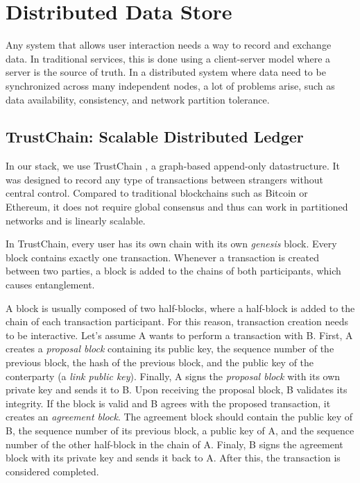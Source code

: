 \section{Distributed Data Store}

Any system that allows user interaction needs a way to record and exchange data. In traditional services, this is done using a client-server model where a server is the source of truth. In a distributed system where data need to be synchronized across many independent nodes, a lot of problems arise, such as data availability, consistency, and network partition tolerance.

\subsection{TrustChain: Scalable Distributed Ledger}

In our stack, we use TrustChain \cite{trustchain}, a graph-based append-only datastructure. It was designed to record any type of transactions between strangers without central control. Compared to traditional blockchains such as Bitcoin or Ethereum, it does not require global consensus and thus can work in partitioned networks and is linearly scalable.

In TrustChain, every user has its own chain with its own \textit{genesis} block. Every block contains exactly one transaction. Whenever a transaction is created between two parties, a block is added to the chains of both participants, which causes entanglement.

A block is usually composed of two half-blocks, where a half-block is added to the chain of each transaction participant. For this reason, transaction creation needs to be interactive. Let's assume A wants to perform a transaction with B. First, A creates a \textit{proposal block} containing its public key, the sequence number of the previous block, the hash of the previous block, and the public key of the conterparty (a \textit{link public key}). Finally, A signs the \textit{proposal block} with its own private key and sends it to B. Upon receiving the proposal block, B validates its integrity. If the block is valid and B agrees with the proposed transaction, it creates an \textit{agreement block}. The agreement block should contain the public key of B, the sequence number of its previous block, a public key of A, and the sequence number of the other half-block in the chain of A. Finaly, B signs the agreement block with its private key and sends it back to A. After this, the transaction is considered completed.

